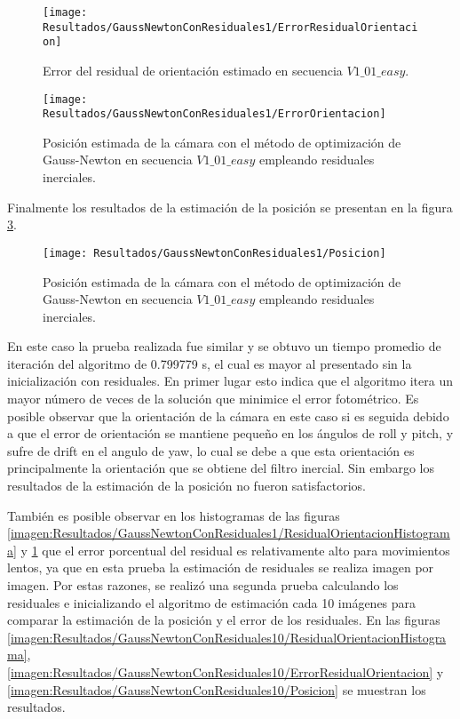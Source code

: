 \begin{figure}[H]
	\centering
	\texttt{[image: Resultados/GaussNewtonConResiduales1/ErrorResidualOrientacion]}
	\caption{ Error del residual de orientación estimado en secuencia $V1\_ 01\_ easy$.}
	\label{imagen:Resultados/GaussNewtonConResiduales1/ErrorResidualOrientacion}
\end{figure}

\begin{figure}[H]
	\centering
	\texttt{[image: Resultados/GaussNewtonConResiduales1/ErrorOrientacion]}
	\caption{Posición estimada de la cámara con el método de optimización de Gauss-Newton en secuencia $V1\_ 01\_ easy$ empleando residuales inerciales. }
	\label{imagen:Resultados/GaussNewtonConResiduales1/ErrorOrientacion}
\end{figure}

Finalmente los resultados de la estimación de la posición se presentan en la figura \ref{imagen:Resultados/GaussNewtonConResiduales1/Posicion}.

\begin{figure}[H]
	\centering
	\texttt{[image: Resultados/GaussNewtonConResiduales1/Posicion]}
	\caption{Posición estimada de la cámara con el método de optimización de Gauss-Newton en secuencia $V1\_ 01\_ easy$ empleando residuales inerciales. }
	\label{imagen:Resultados/GaussNewtonConResiduales1/Posicion}
\end{figure}

En este caso la prueba realizada fue similar y se obtuvo un tiempo promedio de iteración del algoritmo de 0.799779 s, el cual es mayor al presentado sin la inicialización con residuales. En primer lugar esto indica que el algoritmo itera un mayor número de veces de la solución que minimice el error fotométrico. Es posible observar que la orientación de la cámara en este caso si es seguida debido a que el error de orientación se mantiene pequeño en los ángulos de roll y pitch, y sufre de drift en el angulo de yaw, lo cual se debe a que esta orientación es principalmente la orientación que se obtiene del filtro inercial. Sin embargo los resultados de la estimación de la posición no fueron satisfactorios.

También es posible observar en los histogramas de las figuras \ref{imagen:Resultados/GaussNewtonConResiduales1/ResidualOrientacionHistograma} y \ref{imagen:Resultados/GaussNewtonConResiduales1/ErrorResidualOrientacion} que el error porcentual del residual es relativamente alto para movimientos lentos, ya que en esta prueba la estimación de residuales se realiza imagen por imagen. Por estas razones, se realizó una segunda prueba calculando los residuales e inicializando el algoritmo de estimación cada 10 imágenes para comparar la estimación de la posición y el error de los residuales. En las figuras  \ref{imagen:Resultados/GaussNewtonConResiduales10/ResidualOrientacionHistograma}, \ref{imagen:Resultados/GaussNewtonConResiduales10/ErrorResidualOrientacion} y \ref{imagen:Resultados/GaussNewtonConResiduales10/Posicion} se muestran los resultados.


